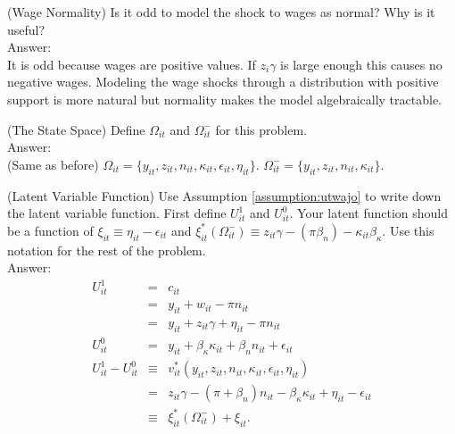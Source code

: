 \begin{exercise} (Wage Normality)
Is it odd to model the shock to wages as normal? Why is it useful?\\
\noindent Answer:\\
\noindent It is odd because wages are positive values. If $z_{i} \gamma$ is large enough this causes no negative wages. Modeling the wage shocks through a distribution with positive support is more natural but normality makes the model algebraically tractable. 
\end{exercise}

\begin{exercise} (The State Space)
Define $\Omega_{it}$ and $\Omega_{it}^-$ for this problem.\\
\noindent Answer:\\
\noindent (Same as before) $\Omega_{it} = \{ y_{it}, z_{it}, n_{it}, \kappa_{it}, \epsilon_{it}, \eta_{it} \}$. $\Omega_{it}^{-} = \{ y_{it}, z_{it}, n_{it}, \kappa_{it} \}$. 
\end{exercise}

\begin{exercise} (Latent Variable Function)
Use Assumption \ref{assumption:utwajo} to write down the latent variable function. First define $U_{it}^1$ and $U_{it}^0$. Your latent function should be a function of $\xi_{it} \equiv \eta_{it} - \epsilon_{it}$ and  $\xi_{it}^*\left( \Omega_{it}^- \right) \equiv z_{it} \gamma - \left( \pi \beta_{n} \right) - \kappa_{it} \beta_{\kappa}$. Use this notation for the rest of the problem.\\
\noindent Answer:\\
\begin{eqnarray}
U_{it}^{1} &=& c_{it} \nonumber \\
           &=& y_{it} + w_{it} - \pi n_{it} \nonumber \\
           &=& y_{it} + z_{it} \gamma + \eta_{it} - \pi n_{it} \\
U_{it}^{0} &=& y_{it} + \beta_{\kappa} \kappa_{it} + \beta_{n} n_{it} + \epsilon_{it} \\
U_{it}^{1} - U_{it}^{0} &\equiv& v_{it}^{*} \left( y_{it}, z_{it}, n_{it}, \kappa_{it}, \epsilon_{it}, \eta_{it}  \right) \nonumber \\ 
           &=& z_{it} \gamma - \left( \pi + \beta_{n} \right) n_{it} - \beta_{\kappa} \kappa_{it} + \eta_{it} - \epsilon_{it} \nonumber \\
           & \equiv & \xi_{it}^{*} \left( \Omega_{it}^{-} \right) + \xi_{it}.
\end{eqnarray}
\end{exercise}

